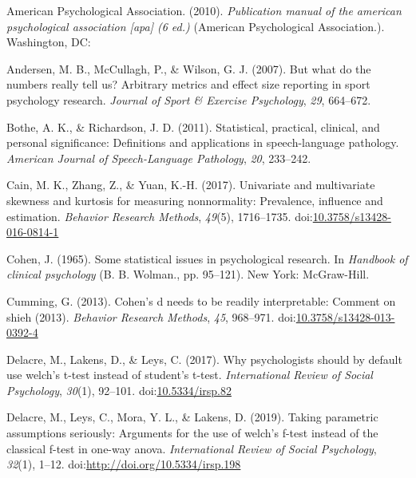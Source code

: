 \documentclass[man]{apa6}
\begin{document}
\leavevmode\hypertarget{ref-APA_2010}{}%
American Psychological Association. (2010). \emph{Publication manual of the american psychological association {[}apa{]} (6 ed.)} (American Psychological Association.). Washington, DC:

\leavevmode\hypertarget{ref-Andersen_et_al_2007}{}%
Andersen, M. B., McCullagh, P., \& Wilson, G. J. (2007). But what do the numbers really tell us? Arbitrary metrics and effect size reporting in sport psychology research. \emph{Journal of Sport \& Exercise Psychology}, \emph{29}, 664--672.

\leavevmode\hypertarget{ref-Bothe_Richardson_2011}{}%
Bothe, A. K., \& Richardson, J. D. (2011). Statistical, practical, clinical, and personal significance: Definitions and applications in speech-language pathology. \emph{American Journal of Speech-Language Pathology}, \emph{20}, 233--242.

\leavevmode\hypertarget{ref-Cain_et_al_2017}{}%
Cain, M. K., Zhang, Z., \& Yuan, K.-H. (2017). Univariate and multivariate skewness and kurtosis for measuring nonnormality: Prevalence, influence and estimation. \emph{Behavior Research Methods}, \emph{49}(5), 1716--1735. doi:\href{https://doi.org/10.3758/s13428-016-0814-1}{10.3758/s13428-016-0814-1}

\leavevmode\hypertarget{ref-Cohen_1965}{}%
Cohen, J. (1965). Some statistical issues in psychological research. In \emph{Handbook of clinical psychology} (B. B. Wolman., pp. 95--121). New York: McGraw-Hill.

\leavevmode\hypertarget{ref-Cumming_2013}{}%
Cumming, G. (2013). Cohen's d needs to be readily interpretable: Comment on shieh (2013). \emph{Behavior Research Methods}, \emph{45}, 968--971. doi:\href{https://doi.org/10.3758/s13428-013-0392-4}{10.3758/s13428-013-0392-4}

\leavevmode\hypertarget{ref-Delacre_et_al_2017}{}%
Delacre, M., Lakens, D., \& Leys, C. (2017). Why psychologists should by default use welch's t-test instead of student's t-test. \emph{International Review of Social Psychology}, \emph{30}(1), 92--101. doi:\href{https://doi.org/10.5334/irsp.82}{10.5334/irsp.82}

\leavevmode\hypertarget{ref-Delacre_et_al_2019}{}%
Delacre, M., Leys, C., Mora, Y. L., \& Lakens, D. (2019). Taking parametric assumptions seriously: Arguments for the use of welch's f-test instead of the classical f-test in one-way anova. \emph{International Review of Social Psychology}, \emph{32}(1), 1--12. doi:\href{https://doi.org/http://doi.org/10.5334/irsp.198}{http://doi.org/10.5334/irsp.198}
\end{document}
